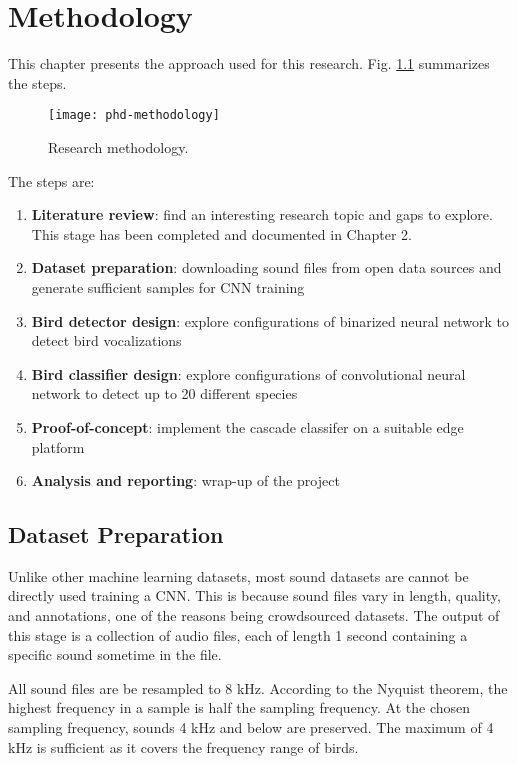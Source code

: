 
\chapter{Methodology}

This chapter presents the approach used for this research.
 Fig. \ref{phd-methodology} summarizes the steps.

\begin{figure}[h]
\centering
\texttt{[image: phd-methodology]}
\caption{Research methodology.}
\label{phd-methodology}
\end{figure}

The steps are:
\begin{enumerate}
    \item \textbf{Literature review}: find an interesting research topic and gaps to explore. This stage has been completed and documented in Chapter 2.
    \item \textbf{Dataset preparation}: downloading sound files from open data sources and generate sufficient samples for CNN training
    \item \textbf{Bird detector design}: explore configurations of binarized neural network to detect bird vocalizations
    \item \textbf{Bird classifier design}: explore configurations of convolutional neural network to detect up to 20 different species
    \item \textbf{Proof-of-concept}: implement the cascade classifer on a suitable edge platform
    \item \textbf{Analysis and reporting}: wrap-up of the project
\end{enumerate}

\section{Dataset Preparation}

Unlike other machine learning datasets, most sound datasets are cannot be directly used training a CNN. This is because sound files vary in length, quality, and annotations, one of the reasons being crowdsourced datasets. The output of this stage is a collection of audio files, each of length 1 second containing a specific sound sometime in the file.

All sound files are be resampled to 8 kHz. According to the Nyquist theorem, the highest frequency in a sample is half the sampling frequency. At the chosen sampling frequency, sounds 4 kHz and below are preserved. The maximum of 4 kHz is sufficient as it covers the frequency range of birds.

